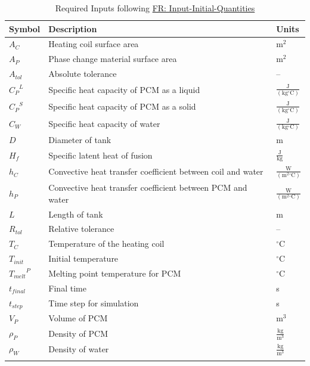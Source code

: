 \documentclass[12pt]{article}
\begin{document}
\begin{longtabu}{l X[l] l}
\toprule
\textbf{Symbol} & \textbf{Description} & \textbf{Units}
\\
\midrule
\endhead
${A_{C}}$ & Heating coil surface area & $\text{m}^{2}$
\\
${A_{P}}$ & Phase change material surface area & $\text{m}^{2}$
\\
${A_{tol}}$ & Absolute tolerance & --
\\
${{C_{P}}^{L}}$ & Specific heat capacity of PCM as a liquid & $\frac{\text{J}}{(\text{kg}{}^{\circ}\text{C})}$
\\
${{C_{P}}^{S}}$ & Specific heat capacity of PCM as a solid & $\frac{\text{J}}{(\text{kg}{}^{\circ}\text{C})}$
\\
${C_{W}}$ & Specific heat capacity of water & $\frac{\text{J}}{(\text{kg}{}^{\circ}\text{C})}$
\\
$D$ & Diameter of tank & m
\\
${H_{f}}$ & Specific latent heat of fusion & $\frac{\text{J}}{\text{kg}}$
\\
${h_{C}}$ & Convective heat transfer coefficient between coil and water & $\frac{\text{W}}{(\text{m}^{2}{}^{\circ}\text{C})}$
\\
${h_{P}}$ & Convective heat transfer coefficient between PCM and water & $\frac{\text{W}}{(\text{m}^{2}{}^{\circ}\text{C})}$
\\
$L$ & Length of tank & m
\\
${R_{tol}}$ & Relative tolerance & --
\\
${T_{C}}$ & Temperature of the heating coil & ${}^{\circ}$C
\\
${T_{init}}$ & Initial temperature & ${}^{\circ}$C
\\
${{T_{melt}}^{P}}$ & Melting point temperature for PCM & ${}^{\circ}$C
\\
${t_{final}}$ & Final time & s
\\
${t_{step}}$ & Time step for simulation & s
\\
${V_{P}}$ & Volume of PCM & $\text{m}^{3}$
\\
${ρ_{P}}$ & Density of PCM & $\frac{\text{kg}}{\text{m}^{3}}$
\\
${ρ_{W}}$ & Density of water & $\frac{\text{kg}}{\text{m}^{3}}$
\\
\bottomrule
\caption{Required Inputs following \hyperref[inputInitQuants]{FR: Input-Initial-Quantities}}
\label{Table:ReqInputs}
\end{longtabu}
\end{document}
